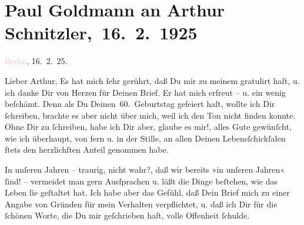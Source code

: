 

\renewcommand{\erwaehnteInstitutionen}{Institutionen: S. Fischer Verlag}
\renewcommand{\erwaehnteOrte}{Orte: Berlin, Wien}
\renewcommand{\erwaehnteWerke}{Werke: Berliner Theater. (»Der Schleier der Beatrice« von Arthur Schnitzler.), Der Schleier der Beatrice. Schauspiel in fünf Akten, Komödie der Worte. Drei Einakter, Lebendige Stunden. Vier Einakter, Neue Freie Presse, Stunde des Erkennens, Tagebuch}
\section[ Paul Goldmann an Arthur Schnitzler, 16. 2. 1925]{Paul Goldmann an Arthur Schnitzler, 16. 2. 1925}
\nopagebreak{}
\rehead{ }\normalsize\beginnumbering{}
\toendnotes[C]{\smallbreak\pagebreak[2]}
\toendnotes[C]{\smallbreak}
\pstart
           {\pb}\textcolor{pink}{Berlin}{}\ledrightnote{\textcolor{pink}{Berlin}}, 16. 2. 25.\pend
           
\pstart{}Lieber Arthur,\pend
\pstart
           Es hat mich ſehr gerührt, daß Du mir zu meinem \label{K_L03478-1v}\label{K_L03478-1h} gratulirt haſt, u. ich danke Dir von Herzen für Deinen Brief. Er hat mich
               erfreut – u. ein wenig beſchämt. Denn als Du \label{K_L03478-2v}\label{K_L03478-2h} Deinen 60. Geburtstag gefeiert haſt, wollte ich Dir ſchreiben, brachte es
               aber nicht über mich, weil ich den Ton nicht finden konnte. Ohne Dir zu ſchreiben,
               habe ich Dir aber, glaube es mir!, alles Gute gewünſcht, wie ich überhaupt, von fern
                  {\pb}u. in 
               der Stille, an allen Deinen Lebensſchickſalen ftets den herzlichſten Anteil genommen
               habe.\pend
           
\pstart
           In unſeren Jahren – traurig, nicht wahr?, daß wir bereits »in unſeren Jahren« ſind! –
               vermeidet man gern Ausſprachen u. läßt die Dinge beſtehen, wie das Leben ſie
               geſtaltet hat. Ich habe aber das Gefühl, daß Dein Brief mich zu einer Angabe von
               Gründen für mein Verhalten verpflichtet, u. daß ich Dir für die ſchönen Worte, die Du
               mir geſchrieben haſt, volle Offenheit ſchulde.\pend
           
